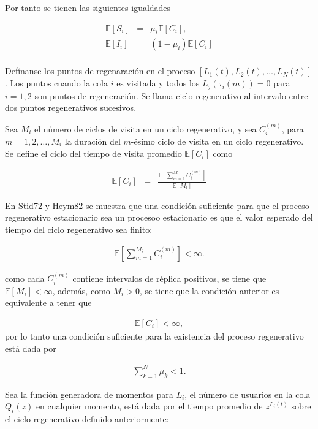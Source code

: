 \documentclass{article}
\newcommand{\esp}{\mathbb{E}}
\begin{document}
Por tanto se tienen las siguientes igualdades


\begin{eqnarray*}
\esp\left[S_{i}\right]&=&\mu_{i}\esp\left[C_{i}\right],\\
\esp\left[I_{i}\right]&=&\left(1-\mu_{i}\right)\esp\left[C_{i}\right]\\
\end{eqnarray*}

Def\'inanse los puntos de regenaraci\'on  en el proceso $\left[L_{1}\left(t\right),L_{2}\left(t\right),\ldots,L_{N}\left(t\right)\right]$. Los puntos cuando la cola $i$ es visitada y todos los $L_{j}\left(\tau_{i}\left(m\right)\right)=0$ para $i=1,2$  son puntos de regeneraci\'on. Se llama ciclo regenerativo al intervalo entre dos puntos regenerativos sucesivos.

Sea $M_{i}$  el n\'umero de ciclos de visita en un ciclo regenerativo, y sea $C_{i}^{(m)}$, para $m=1,2,\ldots,M_{i}$ la duraci\'on del $m$-\'esimo ciclo de visita en un ciclo regenerativo. Se define el ciclo del tiempo de visita promedio $\esp\left[C_{i}\right]$ como

\begin{eqnarray*}
\esp\left[C_{i}\right]&=&\frac{\esp\left[\sum_{m=1}^{M_{i}}C_{i}^{(m)}\right]}{\esp\left[M_{i}\right]}
\end{eqnarray*}


En Stid72 y Heym82 se muestra que una condici\'on suficiente para que el proceso regenerativo 
estacionario sea un procesoo estacionario es que el valor esperado del tiempo del ciclo regenerativo sea finito:

\begin{eqnarray*}
\esp\left[\sum_{m=1}^{M_{i}}C_{i}^{(m)}\right]<\infty.
\end{eqnarray*}

como cada $C_{i}^{(m)}$ contiene intervalos de r\'eplica positivos, se tiene que $\esp\left[M_{i}\right]<\infty$, adem\'as, como $M_{i}>0$, se tiene que la condici\'on anterior es equivalente a tener que 

\begin{eqnarray*}
\esp\left[C_{i}\right]<\infty,
\end{eqnarray*}
por lo tanto una condici\'on suficiente para la existencia del proceso regenerativo est\'a dada por

\begin{eqnarray*}
\sum_{k=1}^{N}\mu_{k}<1.
\end{eqnarray*}

Sea la funci\'on generadora de momentos para $L_{i}$, el n\'umero de usuarios en la cola $Q_{i}\left(z\right)$ en cualquier momento, est\'a dada por el tiempo promedio de $z^{L_{i}\left(t\right)}$ sobre el ciclo regenerativo definido anteriormente:
\end{document}
